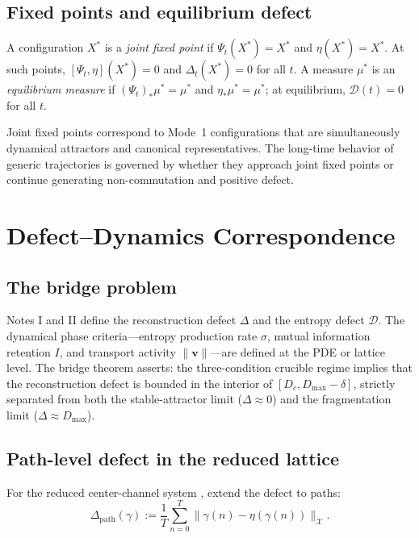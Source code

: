 \documentclass[12pt, oneside]{memoir}
\newcommand{\X}{\mathcal{X}}
\newcommand{\Dpth}{\Delta_{\mathrm{path}}}
\newcommand{\nnorm}[1]{\lVert #1 \rVert}
\newcommand{\bv}{\mathbf{v}}
\begin{document}
\section{Fixed points and equilibrium defect}

A configuration $X^*$ is a \emph{joint fixed point} if $\Psi_t(X^*) = X^*$ and $\eta(X^*) =
X^*$.  At such points, $[\Psi_t, \eta](X^*) = 0$ and $\Delta_t(X^*) = 0$ for all $t$.
A measure $\mu^*$ is an \emph{equilibrium measure} if $(\Psi_t)_*\mu^* = \mu^*$ and
$\eta_*\mu^* = \mu^*$; at equilibrium, $\mathcal{D}(t) = 0$ for all $t$.

Joint fixed points correspond to Mode~1 configurations that are simultaneously dynamical
attractors and canonical representatives.  The long-time behavior of generic trajectories
is governed by whether they approach joint fixed points or continue generating
non-commutation and positive defect.

\chapter{Defect--Dynamics Correspondence}
\label{ch:bridge}

\section{The bridge problem}

Notes I and II define the reconstruction defect $\Delta$ and the entropy defect
$\mathcal{D}$.  The dynamical phase criteria---entropy production rate $\sigma$, mutual
information retention $I$, and transport activity $\nnorm{\bv}$---are defined at the PDE
or lattice level.  The bridge theorem asserts: the three-condition crucible regime implies
that the reconstruction defect is bounded in the interior of $[D_c, D_{\max} - \delta]$,
strictly separated from both the stable-attractor limit ($\Delta \approx 0$) and the
fragmentation limit ($\Delta \approx D_{\max}$).

\section{Path-level defect in the reduced lattice}

For the reduced center-channel system , extend the
defect to paths:
\begin{equation}\label{eq:Dpth}
  \Dpth(\gamma) := \frac{1}{T}\sum_{n=0}^{T} \nnorm{\gamma(n) - \eta(\gamma(n))}_\X.
\end{equation}
\end{document}
